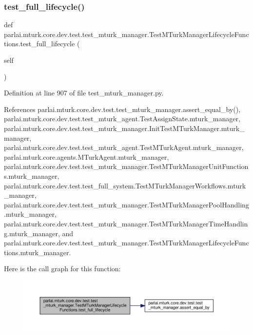 \subsubsection{\texorpdfstring{test\+\_\+full\+\_\+lifecycle()}{test\_full\_lifecycle()}}
{\footnotesize\ttfamily def parlai.\+mturk.\+core.\+dev.\+test.\+test\+\_\+mturk\+\_\+manager.\+Test\+M\+Turk\+Manager\+Lifecycle\+Functions.\+test\+\_\+full\+\_\+lifecycle (\begin{DoxyParamCaption}\item[{}]{self }\end{DoxyParamCaption})}



Definition at line 907 of file test\+\_\+mturk\+\_\+manager.\+py.



References parlai.\+mturk.\+core.\+dev.\+test.\+test\+\_\+mturk\+\_\+manager.\+assert\+\_\+equal\+\_\+by(), parlai.\+mturk.\+core.\+dev.\+test.\+test\+\_\+mturk\+\_\+agent.\+Test\+Assign\+State.\+mturk\+\_\+manager, parlai.\+mturk.\+core.\+dev.\+test.\+test\+\_\+mturk\+\_\+manager.\+Init\+Test\+M\+Turk\+Manager.\+mturk\+\_\+manager, parlai.\+mturk.\+core.\+dev.\+test.\+test\+\_\+mturk\+\_\+agent.\+Test\+M\+Turk\+Agent.\+mturk\+\_\+manager, parlai.\+mturk.\+core.\+agents.\+M\+Turk\+Agent.\+mturk\+\_\+manager, parlai.\+mturk.\+core.\+dev.\+test.\+test\+\_\+mturk\+\_\+manager.\+Test\+M\+Turk\+Manager\+Unit\+Functions.\+mturk\+\_\+manager, parlai.\+mturk.\+core.\+dev.\+test.\+test\+\_\+full\+\_\+system.\+Test\+M\+Turk\+Manager\+Workflows.\+mturk\+\_\+manager, parlai.\+mturk.\+core.\+dev.\+test.\+test\+\_\+mturk\+\_\+manager.\+Test\+M\+Turk\+Manager\+Pool\+Handling.\+mturk\+\_\+manager, parlai.\+mturk.\+core.\+dev.\+test.\+test\+\_\+mturk\+\_\+manager.\+Test\+M\+Turk\+Manager\+Time\+Handling.\+mturk\+\_\+manager, and parlai.\+mturk.\+core.\+dev.\+test.\+test\+\_\+mturk\+\_\+manager.\+Test\+M\+Turk\+Manager\+Lifecycle\+Functions.\+mturk\+\_\+manager.

Here is the call graph for this function\+:
\nopagebreak
\begin{figure}[H]
\begin{center}
\leavevmode
\includegraphics[width=350pt]{classparlai_1_1mturk_1_1core_1_1dev_1_1test_1_1test__mturk__manager_1_1TestMTurkManagerLifecycleFunctions_a33dbbefd45dab90f29727329657e7767_cgraph}
\end{center}
\end{figure}


